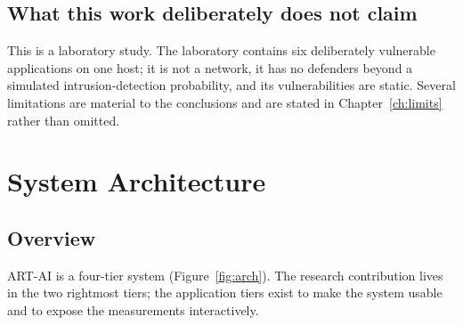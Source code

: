 \documentclass[11pt,a4paper]{report}
\begin{document}
\section{What this work deliberately does not claim}
This is a laboratory study. The laboratory contains six deliberately vulnerable
applications on one host; it is not a network, it has no defenders beyond a
simulated intrusion-detection probability, and its vulnerabilities are static.
Several limitations are material to the conclusions and are stated in
Chapter~\ref{ch:limits} rather than omitted.

\chapter{System Architecture}

\section{Overview}
ART-AI is a four-tier system (Figure~\ref{fig:arch}). The research contribution
lives in the two rightmost tiers; the application tiers exist to make the system
usable and to expose the measurements interactively.
\end{document}
